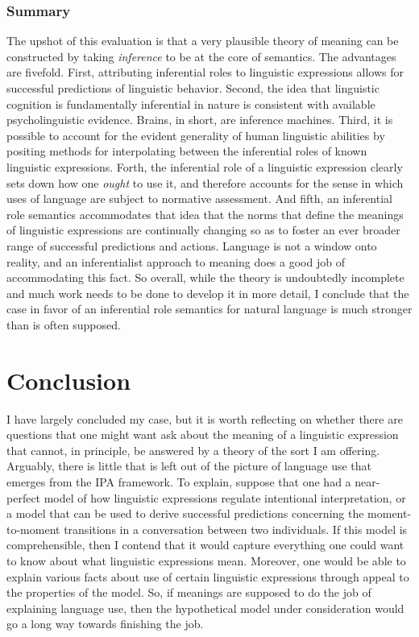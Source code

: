 \subsubsection{Summary}

The upshot of this evaluation is that a very plausible theory of meaning can be constructed by taking \textit{inference} to be at the core of semantics. The advantages are fivefold. First, attributing inferential roles to linguistic expressions allows for successful predictions of linguistic behavior. Second, the idea that linguistic cognition is fundamentally inferential in nature is consistent with available psycholinguistic evidence. Brains, in short, are inference machines. Third, it is possible to account for the evident generality of human linguistic abilities by positing methods for interpolating between the inferential roles of known linguistic expressions. Forth, the inferential role of a linguistic expression clearly sets down how one \textit{ought} to use it, and therefore accounts for the sense in which uses of language are subject to normative assessment. And fifth, an inferential role semantics accommodates that idea that the norms that define the meanings of linguistic expressions are continually changing so as to foster an ever broader range of successful predictions and actions. Language is not a window onto reality, and an inferentialist approach to meaning does a good job of accommodating this fact. So overall, while the theory is undoubtedly incomplete and much work needs to be done to develop it in more detail, I conclude that the case in favor of an inferential role semantics for natural language is much stronger than is often supposed. 

\section{Conclusion}

I have largely concluded my case, but it is worth reflecting on whether there are questions that one might want ask about the meaning of a linguistic expression that cannot, in principle, be answered by a theory of the sort I am offering. Arguably, there is little that is left out of the picture of language use that emerges from the IPA framework. To explain, suppose that one had a near-perfect model of how linguistic expressions regulate intentional interpretation, or a model that can be used to derive successful predictions concerning the moment-to-moment transitions in a conversation between two individuals. If this model is comprehensible, then I contend that it would capture everything one could want to know about what linguistic expressions mean. Moreover, one would be able to explain various facts about use of certain linguistic expressions through appeal to the properties of the model. So, if meanings are supposed to do the job of explaining language use, then the hypothetical model under consideration would go a long way towards finishing the job.

